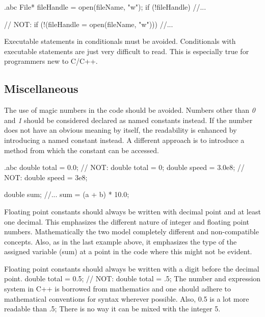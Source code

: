 \begin{filecontents*}{\jobname.abc}
	File* fileHandle = open(fileName, "w");
	if (!fileHandle) {
		//...
	}
	
	// NOT:
	if (!(fileHandle = open(fileName, "w"))) {
		//...
	}
\end{filecontents*}

\recommendation
{Executable statements in conditionals must be avoided.}
{}
{Conditionals with executable statements are just very difficult to read. This is especially true for programmers new to C/C++.}

\subsection{Miscellaneous}

\recommendation
{The use of magic numbers in the code should be avoided. Numbers other than \textit{0} and \textit{1} should be considered declared as named constants instead.}
{}
{If the number does not have an obvious meaning by itself, the readability is enhanced by introducing a named constant instead. A different approach is to introduce a method from which the constant can be accessed.}


\begin{filecontents*}{\jobname.abc}
	double total = 0.0;    // NOT:  double total = 0;
	double speed = 3.0e8;  // NOT:  double speed = 3e8;
	
	double sum;
	//...
	sum = (a + b) * 10.0;
\end{filecontents*}

\recommendation
{Floating point constants should always be written with decimal point and at least one decimal.}
{}
{
	This emphasizes the different nature of integer and floating point numbers. Mathematically the two model completely different and non-compatible concepts.\newline
	Also, as in the last example above, it emphasizes the type of the assigned variable (sum) at a point in the code where this might not be evident.
}

\recommendation
{Floating point constants should always be written with a digit before the decimal point.}
{double total = 0.5;  // NOT:  double total = .5;}
{The number and expression system in C++ is borrowed from mathematics and one should adhere to mathematical conventions for syntax wherever possible. Also, 0.5 is a lot more readable than .5; There is no way it can be mixed with the integer 5.}


